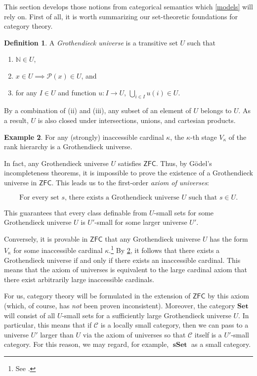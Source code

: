 \documentclass[10pt,letterpaper,cm]{nupset}
\theoremstyle{definition}
\newtheorem{definition}{Definition}[subsection]
\newtheorem{exmp}[definition]{Example}
\theoremstyle{theorem}
\theoremstyle{remark}
\newcommand{\0}{\mathbf{0}}
\newcommand{\1}{\mathbf{1}}
\newcommand{\2}{\mathbf{2}}
\DeclareMathOperator{\sset}{\mathbf{sSet}}
\renewcommand{\c}{\mathscr{C}}
\newcommand{\N}{\mathbb N}
\newcommand{\be}{\begin{enumerate}}
\newcommand{\ee}{\end{enumerate}}
\begin{document}
\medskip  

This section develops those notions from categorical semantics which  \cref{models} will rely on. First of all, it is worth summarizing our set-theoretic foundations for category theory.

\begin{definition}
A \textit{Grothendieck universe} is a transitive set $U$ such that
\be[label=(\roman*)]
\item $\N \in U$,
\item $x\in U \implies \mathcal{P}(x)\in U$, and
\item for any $I\in U$ and function $u: I \to U$, $\bigcup_{i\in I}u(i) \in U$.
\ee 
\end{definition}

By a combination of (ii) and (iii), any subset of an element of $U$ belongs to $U$. As a result, $U$ is also closed under intersections, unions, and cartesian products. 

\begin{exmp}\label{inacc}
For any (strongly) inaccessible cardinal $\kappa$, the $\kappa$-th stage $V_{\kappa}$ of the rank hierarchy is a Grothendieck universe.
\end{exmp}


In fact, any Grothendieck universe $U$ satisfies $\mathsf{ZFC}$. Thus, by G\"odel's incompleteness theorems, it is impossible to prove the existence of a Grothendieck universe in $\mathsf{ZFC}$. This leads us to the first-order \textit{axiom of universes}:

\[
\text{For every set $s$, there exists a Grothendieck universe $U$ such that $s\in U$}.
\]

This guarantees that every class definable from $U$-small sets for some Grothendieck universe $U$ is $U'$-small for some larger    universe $U'$.

\medskip

Conversely, it is provable in $\mathsf{ZFC}$ that any Grothendieck universe $U$ has the form $V_{\kappa}$ for some  inaccessible cardinal $\kappa$.\footnote{See \autocite{Williams}.} By \cref{inacc}, it follows  that there exists a Grothendieck universe if and only if there exists an inaccessible cardinal. This means that the axiom of universes is equivalent to the large cardinal axiom that there exist arbitrarily large inaccessible cardinals. 

\medskip


For us, category theory will be formulated in the extension of $\mathsf{ZFC}$ by this axiom (which, of course, has \emph{not} been proven inconsistent). Moreover, the category $\mathbf{Set}$ will consist of all $U$-small sets for a sufficiently large Grothendieck universe $U$. In particular, this means that if $\c$ is a locally small category, then we can pass to a universe $U'$ larger than $U$ via the axiom of universes so that  $\c$ itself is a $U'$-small category.\label{ssetsmall}  For this reason, we may regard, for example, $\sset$ as a small category.
\end{document}
